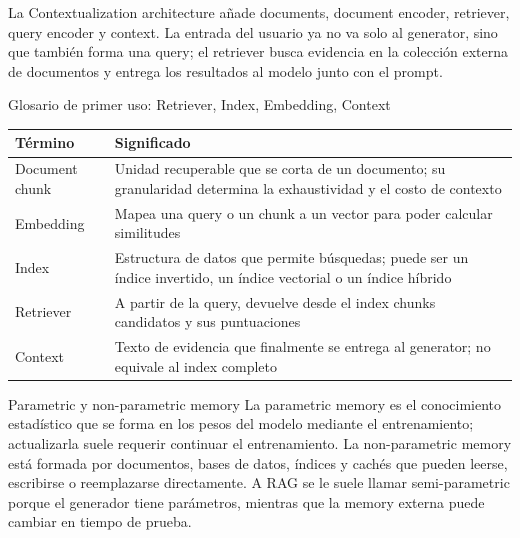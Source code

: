 La Contextualization architecture añade documents, document encoder, retriever, query encoder y context. La entrada del usuario ya no va solo al generator, sino que también forma una query; el retriever busca evidencia en la colección externa de documentos y entrega los resultados al modelo junto con el prompt.


\begin{knowledgebox}{Glosario de primer uso: Retriever, Index, Embedding, Context}
\begin{tabularx}{\textwidth}{L{0.17\textwidth}>{\raggedright\arraybackslash}X}
\toprule
Término & Significado \\
\midrule
Document chunk & Unidad recuperable que se corta de un documento; su granularidad determina la exhaustividad y el costo de contexto \\
Embedding & Mapea una query o un chunk a un vector para poder calcular similitudes \\
Index & Estructura de datos que permite búsquedas; puede ser un índice invertido, un índice vectorial o un índice híbrido \\
Retriever & A partir de la query, devuelve desde el index chunks candidatos y sus puntuaciones \\
Context & Texto de evidencia que finalmente se entrega al generator; no equivale al index completo \\
\bottomrule
\end{tabularx}
\end{knowledgebox}


\begin{importantbox}{Parametric y non-parametric memory}
La parametric memory es el conocimiento estadístico que se forma en los pesos del modelo mediante el entrenamiento; actualizarla suele requerir continuar el entrenamiento. La non-parametric memory está formada por documentos, bases de datos, índices y cachés que pueden leerse, escribirse o reemplazarse directamente. A RAG se le suele llamar semi-parametric porque el generador tiene parámetros, mientras que la memory externa puede cambiar en tiempo de prueba.
\end{importantbox}

